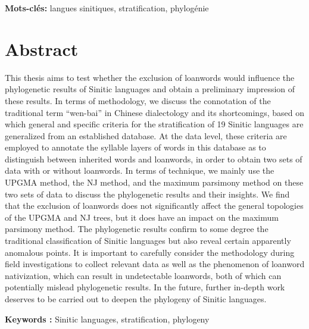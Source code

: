 \documentclass{scrbook}
\newcounter{c}[subsubsection]
\begin{document}
\begin{sloppypar}
\begin{verso}
\noindent \textbf{Mots-clés:} langues sinitiques, stratification, phylogénie

\section*{Abstract}
This thesis aims to test whether the exclusion of loanwords would influence the phylogenetic results of Sinitic languages and obtain a preliminary impression of these results. In terms of methodology, we discuss the connotation of the traditional term ``wen-bai'' in Chinese dialectology and its shortcomings, based on which general and specific criteria for the stratification of 19 Sinitic languages are generalized from an established database. At the data level, these criteria are employed to annotate the syllable layers of words in this database as to distinguish between inherited words and loanwords, in order to obtain two sets of data with or without loanwords. In terms of technique, we mainly use the UPGMA method, the NJ method, and the maximum parsimony method on these two sets of data to discuss the phylogenetic results and their insights. We find that the exclusion of loanwords does not significantly affect the general topologies of the UPGMA and NJ trees, but it does have an impact on the maximum parsimony method. The phylogenetic results confirm to some degree the traditional classification of Sinitic languages but also reveal certain apparently anomalous points. It is important to carefully consider the methodology during field investigations to collect relevant data as well as the phenomenon of loanword nativization, which can result in undetectable loanwords, both of which can potentially mislead phylogenetic results. In the future, further in-depth work deserves to be carried out to deepen the phylogeny of Sinitic languages.

\noindent \textbf{Keywords :} Sinitic languages, stratification, phylogeny
\end{verso}

\end{sloppypar}
\end{document}
